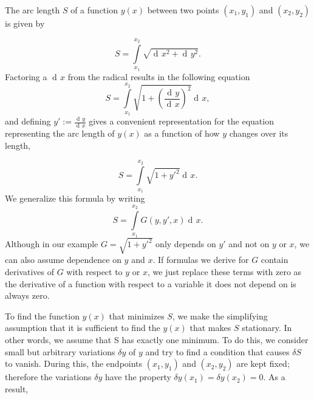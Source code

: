 \documentclass[prb,preprint]{revtex4-1}
\DeclareMathOperator{\dd}{d\!}
\begin{document}
The arc length $S$ of a function $y(x)$ between two points $(x_1,y_1)$ and $(x_2,y_2)$ is given by

\begin{equation}
S=\int\limits_{x_1}^{x_2}\sqrt{\dd x^2 + \dd y^2}.
\end{equation}
Factoring a $\dd x$ from the radical results in the following equation
\begin{equation}
S= \int\limits_{x_1}^{x_2}\sqrt{1 + \left(\frac{\dd y}{\dd x}\right)^2} \dd x,
\end{equation}
and defining $y' := \frac{\dd y}{\dd x}$ gives a convenient representation for the equation representing the arc length of $y(x)$ as a function of how $y$ changes over its length, %

\begin{equation}
S = \int\limits_{x_1}^{x_2}\sqrt{1 + y'^2} \dd x.
\end{equation}
We generalize this formula by writing
\begin{equation}
S=\int\limits_{x_1}^{x_2} G(y,y',x) \dd x .
\end{equation}
Although in our example $G = \sqrt{1 + y'^2}$ only depends on $y'$ and not on $y$ or $x$, we can also assume dependence on $y$ and $x$. %
If formulas we derive for $G$ contain derivatives of $G$ with respect to $y$ or $x$, we just replace these terms with zero as the derivative of a function with respect to a variable it does not depend on is always zero.


To find the function $y(x)$ that minimizes $S$, we make the simplifying assumption that it is sufficient to find the $y(x)$ that makes $S$ stationary. In other words, we assume that S has exactly one minimum.
To do this, we consider small but arbitrary variations $\delta y$ of $y$ and try to find a condition that causes $\delta S$ to vanish. 
During this, the endpoints $(x_1,y_1)$ and $(x_2,y_2)$ are kept fixed; therefore the variations $\delta y$ have the property $\delta y(x_1) = \delta y(x_2) = 0$. 
As a result,
\end{document}
